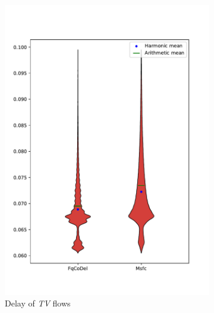 \begin{figure}
\begin{subfigure}[b]{0.475\textwidth}
		\includegraphics[width=\textwidth]{drawings/type3-delay-down_B}
		\caption[]%
		{{\small Delay of \emph{TV} flows}}    
		\label{fig:delay_tv_B}
	\end{subfigure}
	\par\bigskip %
	\begin{subfigure}[b]{0.475\textwidth}   
		\centering 

\end{subfigure}
\end{figure}
